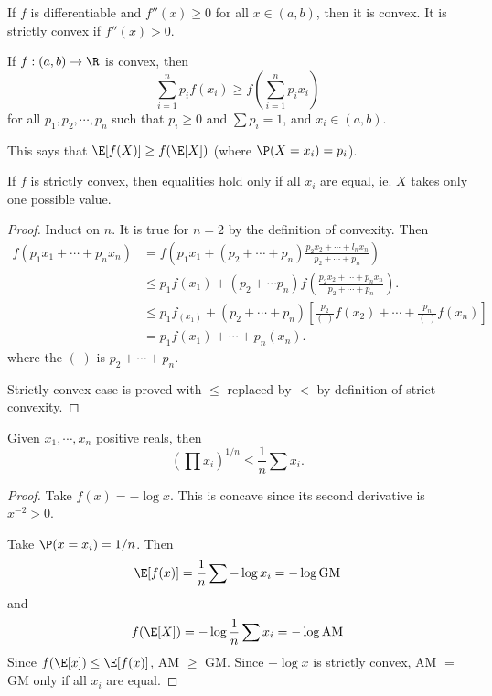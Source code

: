 \documentclass[a4paper]{article}
\begin{document}
\begin{prop}
  If $f$ is differentiable and $f''(x) \geq 0$ for all $x\in (a, b)$, then it is convex. It is strictly convex if $f''(x) > 0$.
\end{prop}

\begin{thm}
  If $f:(a, b) \to \R$ is convex, then
  \[
    \sum_{i = 1}^n p_i f(x_i) \geq f\left(\sum_{i = 1}^n p_ix_i\right)
  \]
  for all $p_1, p_2, \cdots, p_n$ such that $p_i \geq 0$ and $\sum p_i = 1$, and $x_i \in (a, b)$.

  This says that $\E[f(X)] \geq f(\E[X])$ (where $\P(X=x_i) = p_i$).

  If $f$ is strictly convex, then equalities hold only if all $x_i$ are equal, ie. $X$ takes only one possible value.
\end{thm}

\begin{proof}
  Induct on $n$. It is true for $n = 2$ by the definition of convexity. Then
  \begin{align*}
    f(p_1x_1 + \cdots + p_nx_n) &= f\left(p_1x_1 + (p_2 + \cdots + p_n)\frac{p_2x_2 + \cdots + l_nx_n}{p_2 + \cdots + p_n}\right)\\
    &\leq p_1f(x_1) + (p_2 + \cdots p_n)f\left(\frac{p_2x_2 + \cdots + p_n x_n}{p_2 + \cdots + p_n }\right).\\
    &\leq p_1f_(x_1) + (p_2 + \cdots + p_n)\left[\frac{p_2}{(\;)}f(x_2) + \cdots + \frac{p_n}{(\;)}f(x_n)\right]\\
    &= p_1f(x_1) + \cdots + p_n(x_n).
  \end{align*}
  where the $(\;)$ is $p_2 + \cdots + p_n$.

  Strictly convex case is proved with $\leq$ replaced by $<$ by definition of strict convexity.
\end{proof}

\begin{cor}[AM-GM inequality]
  Given $x_1, \cdots, x_n$ positive reals, then
  \[
    \left(\prod x_i\right)^{1/n} \leq \frac{1}{n}\sum x_i.
  \]
\end{cor}

\begin{proof}
  Take $f(x) = -\log x$. This is concave since its second derivative is $x^{-2} > 0$.

  Take $\P(x = x_i) = 1/n$. Then
  \[
    \E[f(x)] = \frac{1}{n}\sum -\log x_i = -\log \text{GM}
  \]
  and
  \[
    f(\E[X]) = -\log \frac{1}{n}\sum x_i = -\log\text{AM}
  \]
  Since $f(\E[x]) \leq \E[f(x)]$, AM $\geq$ GM. Since $-\log x$ is strictly convex, AM $=$ GM only if all $x_i$ are equal.
\end{proof}
\end{document}
